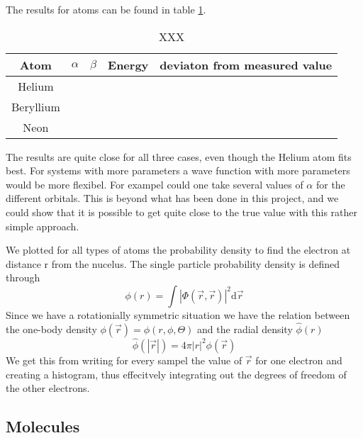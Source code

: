 \documentclass[a4paper,10pt]{article}
\newcommand{\ud}{\mathrm{d}}
\begin{document}
The results for atoms can be found in table \ref{atomtable}.
\begin{table}[htbp]
 \begin{tabular}{|c|c|c|c|c|}
 \hline
 \textbf{Atom} & \textbf{$\alpha$} & \textbf{$\beta$} & \textbf{Energy} & \textbf{deviaton from measured value} \\
 \hline
 Helium & & & & \\
 Beryllium & & & & \\
 Neon & & & & \\ 
 \hline 
 \end{tabular}
\label{atomtable}
\caption{XXX}
\end{table}

The results are quite close for all three cases, even though the Helium atom fits best. For systems with more parameters a wave function with more parameters would
be more flexibel. For exampel could one take several values of $\alpha$ for the different orbitals.
This is beyond what has been done in this project, and we could show that it is possible to get quite close to the 
true value with this rather simple approach.

We plotted for all types of atoms the probability density to find the electron at distance r from the nucelus. 
The single particle probability density is defined through
\begin{equation}
 \phi(r) = \int |\Phi(\vec{r},\vec{r})|^2 \ud \vec{r}
\end{equation}
Since we have a rotationially symmetric situation we have the relation between the one-body density $\phi(\vec{r})=\phi(r,\phi,\Theta)$ 
and the radial density $\hat{\phi}(r)$
\begin{equation}
 \hat{\phi}(|\vec{r}|) =4\pi |r|^2\phi(\vec{r})
\end{equation}
We get this from writing for every sampel the value of $\vec{r}$ for one electron and creating a histogram,
thus effecitvely integrating out the degrees of freedom of the other electrons. 


\subsection{Molecules}
\end{document}
